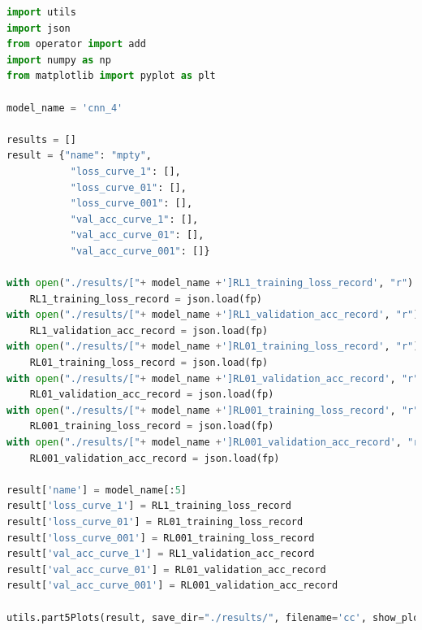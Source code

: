 \documentclass[3p,times,procedia]{elsarticle}
\begin{document}
\begin{lstlisting}[language=Python]
    import utils
import json
from operator import add
import numpy as np
from matplotlib import pyplot as plt

model_name = 'cnn_4'

results = []
result = {"name": "mpty",
           "loss_curve_1": [],
           "loss_curve_01": [],
           "loss_curve_001": [],
           "val_acc_curve_1": [],
           "val_acc_curve_01": [],
           "val_acc_curve_001": []}

with open("./results/["+ model_name +']RL1_training_loss_record', "r") as fp:
    RL1_training_loss_record = json.load(fp)
with open("./results/["+ model_name +']RL1_validation_acc_record', "r") as fp:
    RL1_validation_acc_record = json.load(fp)
with open("./results/["+ model_name +']RL01_training_loss_record', "r") as fp:
    RL01_training_loss_record = json.load(fp)
with open("./results/["+ model_name +']RL01_validation_acc_record', "r") as fp:
    RL01_validation_acc_record = json.load(fp)
with open("./results/["+ model_name +']RL001_training_loss_record', "r") as fp:
    RL001_training_loss_record = json.load(fp)
with open("./results/["+ model_name +']RL001_validation_acc_record', "r") as fp:
    RL001_validation_acc_record = json.load(fp)

result['name'] = model_name[:5]
result['loss_curve_1'] = RL1_training_loss_record
result['loss_curve_01'] = RL01_training_loss_record
result['loss_curve_001'] = RL001_training_loss_record
result['val_acc_curve_1'] = RL1_validation_acc_record
result['val_acc_curve_01'] = RL01_validation_acc_record
result['val_acc_curve_001'] = RL001_validation_acc_record

utils.part5Plots(result, save_dir="./results/", filename='cc', show_plot=True)

\end{lstlisting}



\end{document}
